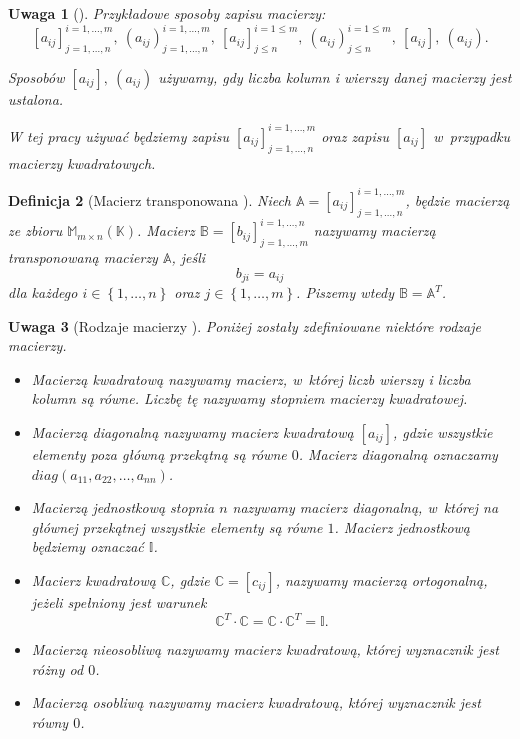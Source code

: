 \documentclass[12pt,a4paper]{report}
\newtheorem{df}{Definicja}[chapter]
\newtheorem{uwaga}[df]{Uwaga}
\newcommand{\set}[1]{\left\lbrace {#1} \right\rbrace}
\newcommand{\setK}{\mathbb{K}}
\begin{document}
\begin{uwaga}[{\citep[Sec 8.1]{alzega}}]
Przykładowe sposoby zapisu macierzy:
$$
[a_{ij}]_{j = 1, \ldots, n}^{i = 1, \ldots , m}, \: (a_{ij})_{j = 1, \ldots, n}^{i = 1, \ldots , m}, \: [a_{ij}]_{j \leq n}^{i = 1 \leq m}, \: (a_{ij})_{j \leq n}^{i = 1 \leq m}, \: [a_{ij}], \: (a_{ij}).
$$

Sposobów $[a_{ij}], \: (a_{ij})$ używamy, gdy liczba kolumn i wierszy danej macierzy jest ustalona. 

W tej pracy używać będziemy zapisu $[a_{ij}]_{j = 1, \ldots, n}^{i = 1, \ldots , m}$ oraz zapisu $[a_{ij}]$ w~przypadku macierzy kwadratowych.
\end{uwaga}

\begin{df}[Macierz transponowana {\citep[Sec 8.1 ]{alzega}}]
Niech $\mathbb{A} = [a_{ij}]_{j = 1, \ldots, n}^{i = 1, \ldots , m}$, będzie macierzą ze zbioru $\mathbb{M}_{m \times n}(\setK)$.
Macierz $\mathbb{B} = [b_{ij}]_{j = 1, \ldots, m}^{i = 1, \ldots , n}$ nazywamy macierzą transponowaną macierzy $\mathbb{A}$, jeśli 
$$
b_{ji} = a_{ij}
$$ 
dla każdego $i \in \set{1, \ldots, n}$ oraz $j \in \set{1, \ldots ,m}$. Piszemy wtedy $\mathbb{B} = \mathbb{A}^T$.
\end{df}

\begin{uwaga}[Rodzaje macierzy {\citep[Sec 8.1, Sec 10.4]{alzega}}]
Poniżej zostały zdefiniowane niektóre rodzaje macierzy.
\begin{itemize}
\item Macierzą kwadratową nazywamy macierz, w~której liczb wierszy i liczba kolumn są równe. Liczbę tę nazywamy stopniem macierzy kwadratowej.
\item Macierzą diagonalną nazywamy macierz kwadratową $[a_{ij}]$, gdzie wszystkie elementy poza główną przekątną są równe $0$. Macierz diagonalną oznaczamy 
\\$diag(a_{11}, a_{22}, \ldots , a_{nn})$.
\item Macierzą jednostkową stopnia $n$ nazywamy macierz diagonalną, w~której na głównej przekątnej wszystkie elementy są równe $1$. Macierz jednostkową będziemy oznaczać $\mathbb{I}$.
\item Macierz kwadratową $\mathbb{C}$, gdzie $\mathbb{C} = [c_{ij}]$, nazywamy macierzą ortogonalną, jeżeli spełniony jest warunek
$$
\mathbb{C}^T \cdot \mathbb{C} = \mathbb{C} \cdot \mathbb{C}^T = \mathbb{I}. 
$$
\item Macierzą nieosobliwą nazywamy macierz kwadratową, której wyznacznik jest różny od $0$.
\item Macierzą osobliwą nazywamy macierz kwadratową, której wyznacznik jest równy $0$.
\end{itemize}
\end{uwaga}
\end{document}
